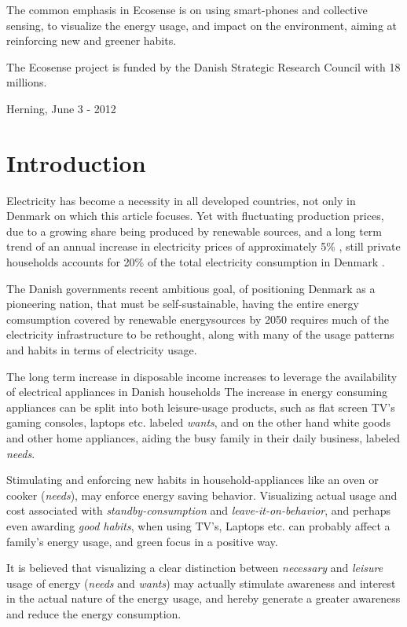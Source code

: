 \documentclass[journal]{IEEEtran}
\begin{document}
The common emphasis in Ecosense is on using smart-phones and collective sensing, to visualize the energy usage, and impact on the environment, aiming at reinforcing new and greener habits. 

The Ecosense project is funded by the Danish Strategic Research Council with 18 millions.
 
\hfill Herning, June 3 - 2012

\section{Introduction}
Electricity has become a necessity in all developed countries, not only in Denmark on which this article focuses. Yet with fluctuating production prices, due to a growing share being produced by renewable sources, and a long term trend of an annual increase in electricity prices of approximately 5\% \cite{udv_elpriser}, still private households accounts for 20\% of the total electricity consumption in Denmark \cite{energistat}.

The Danish governments recent ambitious goal, of positioning Denmark as a pioneering nation, that must be self-sustainable, having the entire energy comsumption covered by renewable energysources by 2050 \cite{energipolitik_2020} requires much of the electricity infrastructure to be rethought, along with many of the usage patterns and habits in terms of electricity usage.


The long term increase in disposable income increases to leverage the availability of electrical appliances in Danish households %
The increase in energy consuming appliances can be split into both leisure-usage products, such as flat screen TV's gaming consoles, laptops etc. labeled \textit{wants}, and on the other hand white goods and other home appliances, aiding the busy family in their daily business, labeled \textit{needs}.

Stimulating and enforcing new habits in household-appliances like an oven or cooker (\textit{needs}), may enforce energy saving behavior. 
Visualizing actual usage and cost associated with \textit{standby-consumption} and \textit{leave-it-on-behavior}, and perhaps even awarding \textit{good habits}, when using TV's, Laptops etc. can probably affect a family's energy usage, and green focus in a positive way.

It is believed that visualizing a clear distinction between \textit{necessary} and \textit{leisure} usage of energy (\textit{needs} and \textit{wants}) may actually stimulate awareness and interest in the actual nature of the energy usage, and hereby generate a greater awareness and reduce the energy consumption.
\end{document}
